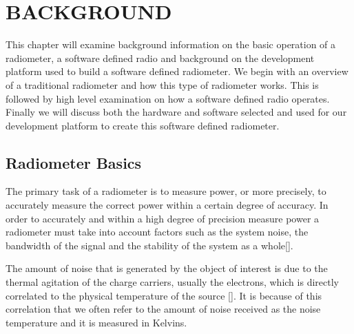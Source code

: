 

\chapter{BACKGROUND}\label{ch:background}

This chapter will examine background information on the basic operation of a radiometer, a software defined radio and background on the development platform used to build a software defined radiometer.  We begin with an overview of a traditional radiometer and how this type of radiometer works.  This is followed by high level examination on how a software defined radio operates.  Finally we will discuss both the hardware and software selected and used for our development platform to create this software defined radiometer.

\section{Radiometer Basics}\label{rad_basics}

The primary task of a radiometer is to measure power, or more precisely, to accurately measure the correct power within a certain degree of accuracy.  In order to accurately and within a high degree of precision measure power a radiometer must take into account factors such as the system noise, the bandwidth of the signal and the stability of the system as a whole[\cite{Evans}]. 

The amount of noise that is generated by the object of interest is due to the thermal agitation of the charge carriers, usually the electrons, which is directly correlated to the physical temperature of the source [\cite{Nyquist1928thermal}].  It is because of this correlation that we often refer to the amount of noise received as the noise temperature and it is measured in Kelvins. 

